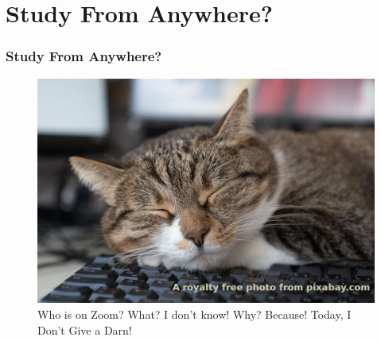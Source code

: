 \documentclass[aspectratio=169, xcolor=table, notheorems, hyperref={pdfpagelabels=false}]{beamer}
\begin{document}
\section{Study From Anywhere?}
\begin{frame}[fragile]
\frametitle{Study From Anywhere?}
\begin{figure}
\includegraphics[width=0.64\linewidth]{os-cat}
\caption{Who is on Zoom? What? I don't know! Why? Because! Today, I Don't Give a Darn!}
\end{figure}
\end{frame}
\end{document}
